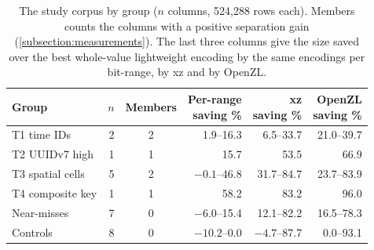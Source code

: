 \begin{table}[t]
  \footnotesize
  \setlength{\tabcolsep}{2.5pt}
  \caption{The study corpus by group ($n$ columns, 524{,}288 rows each). Members counts the columns with a positive separation gain (\autoref{subsection:measurements}). The last three columns give the size saved over the best whole-value lightweight encoding by the same encodings per bit-range, by xz and by OpenZL.}
  \label{tab:class_study_grouped}
  \begin{tabular}{lrcrrr}
    \toprule
    Group & $n$ &  Members & \shortstack[r]{Per-range\\saving \%} & \shortstack[r]{xz\\saving \%} & \shortstack[r]{OpenZL\\saving \%} \\
    \midrule
    T1 time IDs & 2 & 2 & 1.9--16.3 & 6.5--33.7 & 21.0--39.7 \\
    T2 UUIDv7 high & 1 & 1 & 15.7 & 53.5 & 66.9 \\
    T3 spatial cells & 5 & 2 & $-0.1$--46.8 & 31.7--84.7 & 23.7--83.9 \\
    T4 composite key & 1 & 1 & 58.2 & 83.2 & 96.0 \\
    \midrule
    Near-misses & 7 & 0 & $-6.0$--15.4 & 12.1--82.2 & 16.5--78.3 \\
    Controls & 8 & 0 & $-10.2$--0.0 & $-4.7$--87.7 & 0.0--93.1 \\
    \bottomrule
  \end{tabular}
\end{table}
